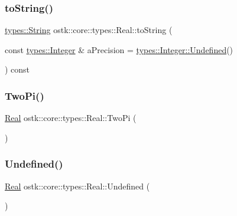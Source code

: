 \mbox{\label{classostk_1_1core_1_1types_1_1_real_ae138041e5d596e63f216452686eeb34c}} 
\subsubsection{\texorpdfstring{to\+String()}{toString()}}
{\footnotesize\ttfamily \hyperlink{classostk_1_1core_1_1types_1_1_string}{types\+::\+String} ostk\+::core\+::types\+::\+Real\+::to\+String (\begin{DoxyParamCaption}\item[{const \hyperlink{classostk_1_1core_1_1types_1_1_integer}{types\+::\+Integer} \&}]{a\+Precision = {\ttfamily \hyperlink{classostk_1_1core_1_1types_1_1_integer_a389855c42819131d631ce512f0fc6947}{types\+::\+Integer\+::\+Undefined}()} }\end{DoxyParamCaption}) const}

\mbox{\label{classostk_1_1core_1_1types_1_1_real_a8c995836c952adbcc93b870eda8dc35e}} 
\subsubsection{\texorpdfstring{Two\+Pi()}{TwoPi()}}
{\footnotesize\ttfamily \hyperlink{classostk_1_1core_1_1types_1_1_real}{Real} ostk\+::core\+::types\+::\+Real\+::\+Two\+Pi (\begin{DoxyParamCaption}{ }\end{DoxyParamCaption})\hspace{0.3cm}{\ttfamily [static]}}

\mbox{\label{classostk_1_1core_1_1types_1_1_real_a7bf59f4590828dd01e9d60717e3ec1b2}} 
\subsubsection{\texorpdfstring{Undefined()}{Undefined()}}
{\footnotesize\ttfamily \hyperlink{classostk_1_1core_1_1types_1_1_real}{Real} ostk\+::core\+::types\+::\+Real\+::\+Undefined (\begin{DoxyParamCaption}{ }\end{DoxyParamCaption})\hspace{0.3cm}{\ttfamily [static]}}

